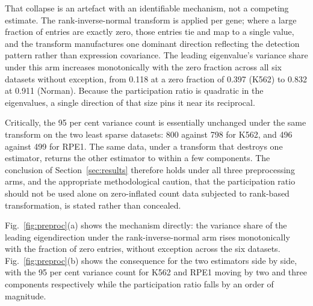 \documentclass[journal,twoside,web]{ieeecolor}
\begin{document}
That collapse is an artefact with an identifiable mechanism, not a competing
estimate. The rank-inverse-normal transform is applied per gene; where a large
fraction of entries are exactly zero, those entries tie and map to a single
value, and the transform manufactures one dominant direction reflecting the
detection pattern rather than expression covariance. The leading eigenvalue's
variance share under this arm increases monotonically with the zero fraction
across all six datasets without exception, from 0.118 at a zero fraction of
0.397 (K562) to 0.832 at 0.911 (Norman). Because the participation ratio is
quadratic in the eigenvalues, a single direction of that size pins it near its
reciprocal.

Critically, the 95 per cent variance count is essentially unchanged under the
same transform on the two least sparse datasets: 800 against 798 for K562, and
496 against 499 for RPE1. The same data, under a transform that destroys one
estimator, returns the other estimator to within a few components. The
conclusion of Section~\ref{sec:results} therefore holds under all three
preprocessing arms, and the appropriate methodological caution, that the
participation ratio should not be used alone on zero-inflated count data
subjected to rank-based transformation, is stated rather than concealed.

Fig.~\ref{fig:preproc}(a) shows the mechanism directly: the variance share of
the leading eigendirection under the rank-inverse-normal arm rises
monotonically with the fraction of zero entries, without exception across the
six datasets. Fig.~\ref{fig:preproc}(b) shows the consequence for the two
estimators side by side, with the 95 per cent variance count for K562 and RPE1
moving by two and three components respectively while the participation ratio
falls by an order of magnitude.
\end{document}
